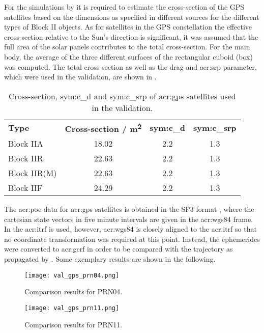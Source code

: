 For the simulations by \neptune{} it is required to estimate the cross-section of the GPS satellites based on the dimensions as specified in different sources for the different types of Block II objects. As for satellites in the GPS constellation the effective cross-section relative to the Sun's direction is significant, it was assumed that the full area of the solar panels contributes to the total cross-section. For the main body, the average of the three different surfaces of the rectangular cuboid (box) was computed. The total cross-section as well as the drag and \gls{acr:srp} parameter, which were used in the validation, are shown in .
\begin{table}[h!]
 \centering
 \caption{Cross-section, \gls{sym:c_d} and \gls{sym:c_srp} of \acrshort{acr:gps} satellites used in the validation.\label{tab:val-gps-sim-data}}
 \begin{tabular}{lSSS}
  \toprule
  	\textbf{Type} & \textbf{Cross-section / \si{\metre\squared}} & \textbf{\gls{sym:c_d}} & \textbf{\gls{sym:c_srp}} \\
  Block IIA       &     18.02 & 2.2 & 1.3\\
  Block IIR      &     22.63 & 2.2 & 1.3\\
  Block IIR(M) &     22.63 & 2.2 & 1.3\\
  Block IIF       &     24.29 & 2.2 & 1.3\\
  \bottomrule
 \end{tabular}
\end{table}

The \gls{acr:poe} data for \gls{acr:gps} satellites is obtained in the SP3 format \citep{remondi1989}, where the cartesian state vectors in five minute intervals are given in the \acrshort{acr:wgs}84 frame. In \neptune{} the \gls{acr:itrf} is used, however, \acrshort{acr:wgs}84 is closely aligned to the 
\gls{acr:itrf} \citep{tapley2004} so that no coordinate transformation was required at this point. Instead, the ephemerides were converted to \gls{acr:gcrf} in order to be compared with the trajectory as propagated by \neptune{}. Some exemplary results are shown in the following.
\begin{figure}[!h]
 \centering
 \texttt{[image: val\_gps\_prn04.png]}
 \caption{Comparison results for PRN04.\label{fig:val-gps-prn04}}
\end{figure}

\begin{figure}[!h]
 \centering
 \texttt{[image: val\_gps\_prn11.png]}
 \caption{Comparison results for PRN11.\label{fig:val-gps-prn11}}
\end{figure}

